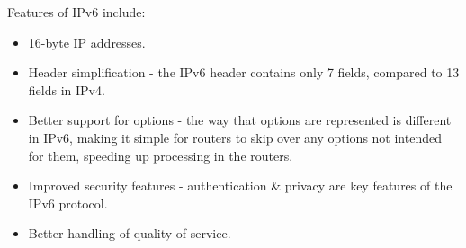 \documentclass[11pt]{article}
\begin{document}
Features of IPv6 include:
\begin{itemize}
    \item   16-byte IP addresses.
    \item   Header simplification - the IPv6 header contains only 7 fields, compared to 13 fields in IPv4.
    \item   Better support for options - the way that options are represented is different in IPv6, making it simple for routers to skip over any options not intended for them, speeding up processing in the routers.
    \item   Improved security features - authentication \& privacy are key features of the IPv6 protocol.
    \item   Better handling of quality of service.
\end{itemize}
\end{document}
